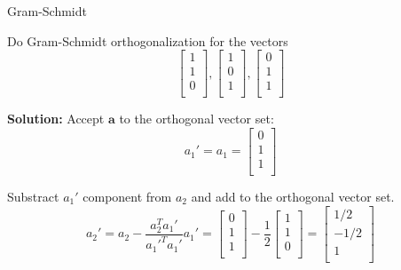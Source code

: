 \documentclass{beamer}
\begin{document}
\begin{frame}{Gram-Schmidt}
\begin{example}
Do Gram-Schmidt orthogonalization for the vectors
\begin{equation*}
    \left[ \begin{array}{c}
        1\\
        1\\
        0\\
    \end{array} \right] , \left[ \begin{array}{c}
        1\\
        0\\
        1\\
    \end{array} \right] , \left[ \begin{array}{c}
        0\\
        1\\
        1\\
    \end{array} \right]
\end{equation*}
\end{example}
\textbf{Solution:}
Accept $\mathbf{a}$ to the orthogonal vector set:
\begin{equation*}
    a_1'=a_1=\left[ \begin{array}{c}
        0\\
        1\\
        1\\
    \end{array} \right]
\end{equation*}

Substract $a_1'$ component from $a_2$ and add to the orthogonal vector set.
\begin{equation*}
    a_2'=a_2-\frac{a_2^Ta_1'}{a_1'^Ta_1'}a_1'=\left[ \begin{array}{c}
        0\\
        1\\
        1\\
    \end{array} \right] -\frac{1}{2}\left[ \begin{array}{c}
        1\\
        1\\
        0\\
    \end{array} \right] =\left[ \begin{array}{c}
        1/2\\
        -1/2\\
        1\\
    \end{array} \right]
\end{equation*}

\end{frame}
\end{document}
